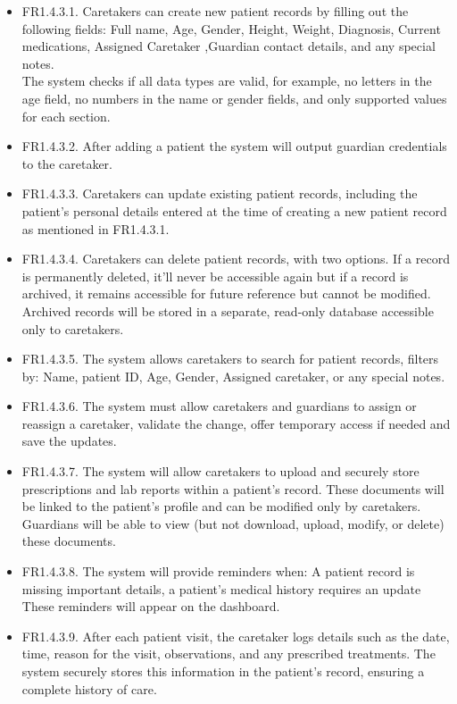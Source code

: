\documentclass[12pt,a4paper]{article}
\begin{document}
\begin{itemize}
    \item FR1.4.3.1. Caretakers can create new patient records by filling out the following fields: Full name, Age, Gender, Height, Weight, Diagnosis, Current medications, Assigned Caretaker ,Guardian contact details, and any special notes. 
\\The system checks if all data types are valid, for example, no letters in the age field, no 
numbers in the name or gender fields, and only supported values for each section. 
    \item FR1.4.3.2. After adding a patient the system will output guardian credentials to the caretaker. 
    \item FR1.4.3.3. Caretakers can update existing patient records, including the patient’s personal 
details entered at the time of creating a new patient record as mentioned in FR1.4.3.1.
    \item FR1.4.3.4. Caretakers can delete patient records, with two options. If a record is permanently 
deleted, it’ll never be accessible again but if a record is archived, it remains accessible 
for future reference but cannot be modified. Archived records will be stored in a 
separate, read-only database accessible only to caretakers. 
    \item FR1.4.3.5. The system allows caretakers to search for patient records, filters by: Name, patient ID, Age, Gender, Assigned caretaker, or any special notes. 
    \item FR1.4.3.6. The system must allow caretakers and guardians to assign or reassign a caretaker, 
validate the change, offer temporary access if needed and save the updates. 
    \item FR1.4.3.7. The system will allow caretakers to upload and securely store prescriptions and lab 
reports within a patient’s record. These documents will be linked to the patient’s 
profile and can be modified only by caretakers. Guardians will be able to view (but not 
download, upload, modify, or delete) these documents. 
    \item FR1.4.3.8. The system will provide reminders when: A patient record is missing important details, a patient’s medical history requires an update 
    \\These reminders will appear on the dashboard. 
    \item FR1.4.3.9. After each patient visit, the caretaker logs details such as the date, time, reason for the 
visit, observations, and any prescribed treatments. The system securely stores this 
information in the patient's record, ensuring a complete history of care. 
    \end{itemize}
    
\end{document}
